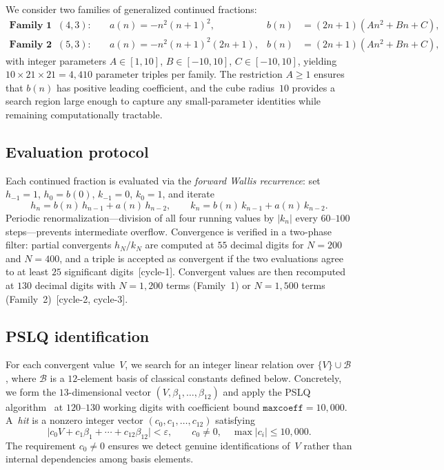 \documentclass[11pt]{amsart}
\newcommand{\calB}{\mathcal{B}}
\theoremstyle{plain}
\theoremstyle{remark}
\begin{document}
We consider two families of generalized continued fractions:
\begin{align}
  \textbf{Family~1}\;\; (4,3)\colon\quad
  & a(n) = -n^2(n+1)^2,
  & b(n) &= (2n+1)(An^2 + Bn + C),
  \label{eq:fam1} \\[4pt]
  \textbf{Family~2}\;\; (5,3)\colon\quad
  & a(n) = -n^2(n+1)^2(2n+1),
  & b(n) &= (2n+1)(An^2 + Bn + C),
  \label{eq:fam2}
\end{align}
with integer parameters $A \in [1,10]$, $B \in [-10,10]$,
$C \in [-10,10]$,
yielding $10 \times 21 \times 21 = 4{,}410$ parameter triples
per family.
The restriction $A \geq 1$ ensures that $b(n)$ has positive
leading coefficient, and the cube radius~$10$ provides a search
region large enough to capture any small-parameter identities
while remaining computationally tractable.

\subsection{Evaluation protocol}
Each continued fraction is evaluated via the \emph{forward Wallis
recurrence}: set $h_{-1} = 1$, $h_0 = b(0)$,
$k_{-1} = 0$, $k_0 = 1$, and iterate
\begin{equation}\label{eq:wallis}
  h_n = b(n)\,h_{n-1} + a(n)\,h_{n-2}, \qquad
  k_n = b(n)\,k_{n-1} + a(n)\,k_{n-2}.
\end{equation}
Periodic renormalization---division of all four running values
by $|k_n|$ every $60$--$100$ steps---prevents intermediate overflow.
Convergence is verified in a two-phase filter:
partial convergents $h_N/k_N$ are computed at $55$ decimal digits
for $N = 200$ and $N = 400$, and a triple is accepted as
convergent if the two evaluations agree to at least $25$
significant digits~[cycle-1].
Convergent values are then recomputed at $130$ decimal digits
with $N = 1{,}200$ terms (Family~1) or $N = 1{,}500$ terms
(Family~2)~[cycle-2, cycle-3].

\subsection{PSLQ identification}
For each convergent value~$V$, we search for an integer
linear relation over $\{V\} \cup \calB$, where $\calB$
is a $12$-element basis of classical constants defined below.
Concretely, we form the $13$-dimensional vector
$(V, \beta_1, \ldots, \beta_{12})$ and apply the PSLQ
algorithm~\cite{ferguson1999} at $120$--$130$ working digits
with coefficient bound $\texttt{maxcoeff} = 10{,}000$.
A~\emph{hit} is a nonzero integer vector
$(c_0, c_1, \ldots, c_{12})$ satisfying
\[
  \bigl|c_0 V + c_1 \beta_1 + \cdots + c_{12} \beta_{12}\bigr|
  < \varepsilon,
  \qquad c_0 \neq 0,
  \quad \max|c_i| \leq 10{,}000.
\]
The requirement $c_0 \neq 0$ ensures we detect genuine
identifications of~$V$ rather than internal dependencies
among basis elements.
\end{document}
